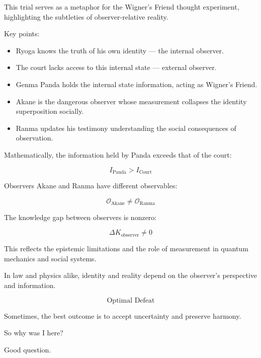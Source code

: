 \documentclass[12pt]{article}
\begin{document}
\begin{tcolorbox}[title=Professor Wigner:]
This trial serves as a metaphor for the Wigner’s Friend thought experiment, highlighting the subtleties of observer-relative reality.

Key points:

\begin{itemize}
    \item Ryoga knows the truth of his own identity — the internal observer.
    \item The court lacks access to this internal state — external observer.
    \item Genma Panda holds the internal state information, acting as Wigner’s Friend.
    \item Akane is the dangerous observer whose measurement collapses the identity superposition socially.
    \item Ranma updates his testimony understanding the social consequences of observation.
\end{itemize}

Mathematically, the information held by Panda exceeds that of the court:

\[
I_{\text{Panda}} > I_{\text{Court}}
\]

Observers Akane and Ranma have different observables:

\[
\mathcal O_{\text{Akane}}
\neq
\mathcal O_{\text{Ranma}}
\]

The knowledge gap between observers is nonzero:

\[
\Delta K_{\text{observer}}
\neq 0
\]

This reflects the epistemic limitations and the role of measurement in quantum mechanics and social systems.

In law and physics alike, identity and reality depend on the observer’s perspective and information.

\[
\boxed{\text{Optimal Defeat}}
\]

\noindent
Sometimes, the best outcome is to accept uncertainty and preserve harmony.
\end{tcolorbox}

\begin{tcolorbox}[title={Genma (Panda):}]
So why was I here?
\end{tcolorbox}

\begin{tcolorbox}[title=Ranma:]
Good question.
\end{tcolorbox}
\end{document}
